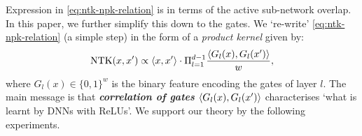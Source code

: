 \begin{comment}
Expression in \eqref{eq:ntk-npk-relation} is in terms of the active sub-network overlap. In this paper, we further simplify this down to the gates. We `re-write' \eqref{eq:ntk-npk-relation} (a simple step) in the form of a \emph{product kernel} given by:
\begin{align}\label{eq:main}
\text{NTK}(x,x') \propto \langle x,x'\rangle\cdot \Pi_{l=1}^{d-1} \frac{\ip{G_l(x),G_l(x')}}w, 
 \end{align}
where $G_l(x)\in\{0,1\}^w$ is the binary feature encoding the gates of layer $l$. Product kernel in \eqref{eq:main} leads to the following interpretation: the basic building units are the gates; the gates of a layer `$l$' yield the binary feature $G_l(x)$; at the heart are the \textbf{base kernels  $\frac{\ip{G_l(x),G_l(x')}}w$ which measure the \emph{correlation of gates}} (in contrast to correlation of outputs as in Neural Gaussian Process kernel \citenum{convgp,fcgp}); width gives averaging (division by $w$); laying out the gates as masks depth-wise and connecting them with weights in the form of a network provides the product structure $\Pi_{l=1}^{d-1} (\cdot)$\footnote{Mere concatenation (instead of a network layout) of the gates as $\varphi(x)=(G_l(x),l=1,\ldots,d-1)\in\{0,1\}^{(d-1)w}$ gives the kernel $\ip{\varphi(x),\varphi(x')}=\sum_{l=1}^{d-1}\frac{\ip{G_l(x),G_l(x')}}w$, i.e., a \textbf{sum  (not product)} of base kernels.}. To our knowledge, \eqref{eq:main} is the simplest kernel expression in literature that analytically characterises `what' is learnt in a DNN with ReLUs, and explicitises roles of depth, width and gates. Expression \eqref{eq:main} suggests that `correlation of the gates' is key and any operation that does not disturb it should not degrade the performance. 
\end{comment}
Expression in \eqref{eq:ntk-npk-relation} is in terms of the active sub-network overlap. In this paper, we further simplify this down to the gates. We `re-write' \eqref{eq:ntk-npk-relation} (a simple step) in the form of a \emph{product kernel} given by:
\begin{align}\label{eq:main}
\text{NTK}(x,x') \propto \langle x,x'\rangle\cdot \Pi_{l=1}^{d-1} \frac{\langle G_l(x),G_l(x')\rangle}w, 
 \end{align}
where $G_l(x)\in\{0,1\}^w$ is the binary feature encoding the gates of layer $l$. The main message is that \textbf{\emph{correlation of gates} $\langle G_l(x),G_l(x')\rangle$} characterises `what is learnt by DNNs with ReLUs'. We support our theory by the following experiments.
